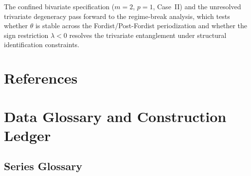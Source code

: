 \documentclass[11pt,a4paper]{article}
\begin{document}
\noindent
The confined bivariate specification ($m = 2$, $p = 1$, Case~II) and the
unresolved trivariate degeneracy pass forward to the regime-break analysis,
which tests whether $\hat{\theta}$ is stable across the
Fordist/Post-Fordist periodization and whether the sign restriction
$\lambda < 0$ resolves the trivariate entanglement under structural
identification constraints.


\section{References}


\label{references}

\pagebreak
\appendix


\section{Data Glossary and Construction Ledger}
\label{app:data_ledger}


\subsection{Series Glossary}
\end{document}
